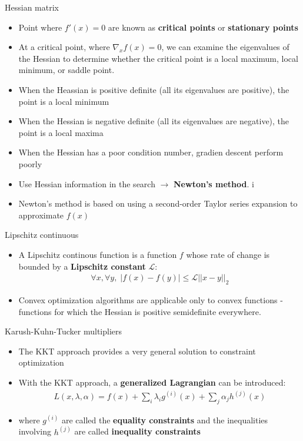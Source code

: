 \documentclass[10pt,mathserif]{beamer}
\begin{document}
\begin{frame}{Hessian matrix}
\begin{itemize}
\item Point where $f'(x) = 0$ are known as \textbf{critical points} or \textbf{stationary points}
\item At a critical point, where $\nabla_x f(x) =0$, we can examine the eigenvalues of the Hessian to determine
whether the critical point is a local maximum, local minimum, or saddle point.
\item When the Heassian is positive definite (all its eigenvalues are positive), the point is a local minimum
\item When the Hessian is negative definite (all its eigenvalues are negative), the point is a local maxima
\item When the Hessian has a poor condition number, gradien descent perform poorly
\item Use Hessian information in the search $\rightarrow$ \textbf{Newton's method}.
i\item Newton's method is based on using a second-order Taylor series expansion to approximate $f(x)$
\end{itemize}
\end{frame}

\begin{frame}{Lipschitz continuous}
\begin{itemize}
\item A Lipschitz continous function is a function $f$ whose rate of change is bounded by a \textbf{Lipschitz constant} $\mathcal{L}$:
\begin{align}
\forall x, \forall y, \; |f(x) - f(y)| \le \mathcal{L}||x - y||_2
\end{align}
\item Convex optimization algorithms are applicable only to convex functions - functions for which the Hessian is 
positive semidefinite everywhere.
\end{itemize}
\end{frame}

\begin{frame}{Karush-Kuhn-Tucker multipliers}
\begin{itemize}
\item The KKT approach provides a very general solution to constraint optimization
\item With the KKT approach, a \textbf{generalized Lagrangian} can be introduced:
\begin{align}
L(x,\lambda, \alpha) = f(x) + \sum_i\lambda_i g^{(i)}(x) + \sum_j\alpha_jh^{(j)}(x)
\end{align}
\item where $g^{(i)}$ are called the \textbf{equality constraints} and the inequalities involving $h^{(j)}$ are
called \textbf{inequality constraints}
\end{itemize}
\end{frame}
\end{document}
